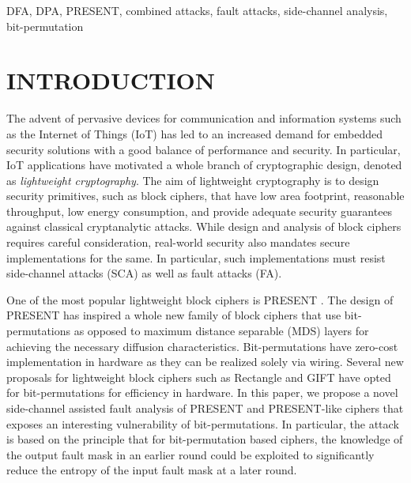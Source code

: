 \documentclass[10pt, conference, compsocconf]{IEEEtran}  %
\numberwithin{Definition}{section}
\numberwithin{Claim}{section}
\begin{document}
\begin{IEEEkeywords}
DFA, DPA, PRESENT, combined attacks, fault attacks, side-channel analysis, bit-permutation

\end{IEEEkeywords}
\IEEEpeerreviewmaketitle


\section{INTRODUCTION}


The advent of pervasive devices for communication and information systems such as the Internet of Things (IoT) has led to an increased demand for embedded security solutions with a good balance of performance and security. In particular, IoT applications have motivated a whole branch of cryptographic design, denoted as \emph{lightweight cryptography}. The aim of lightweight cryptography is to design security primitives, such as block ciphers, that have low area footprint, reasonable throughput, low energy consumption, and provide adequate security guarantees against classical cryptanalytic attacks. While design and analysis of block ciphers requires careful consideration, real-world security also mandates secure implementations for the same. In particular, such implementations must resist side-channel attacks (SCA) as well as fault attacks (FA). %

One of the most popular lightweight block ciphers is PRESENT \cite{DBLP:conf/ches/BogdanovKLPPRSV07}. %
The design of PRESENT has inspired a whole new family of block ciphers that use bit-permutations as opposed to maximum distance separable (MDS) layers for achieving the necessary diffusion characteristics. Bit-permutations have zero-cost implementation in hardware as they can be realized solely via wiring. Several new proposals for lightweight block ciphers such as Rectangle \cite{DBLP:journals/chinaf/ZhangBLR0V15} and GIFT \cite{gift} have opted for bit-permutations for efficiency in hardware. In this paper, we propose a novel side-channel assisted fault analysis of PRESENT and PRESENT-like ciphers that exposes an interesting vulnerability of bit-permutations. In particular, the attack is based on the principle that for bit-permutation based ciphers, the knowledge of the output fault mask in an earlier round could be exploited to significantly reduce the entropy of the input fault mask at a later round. 
\end{document}
